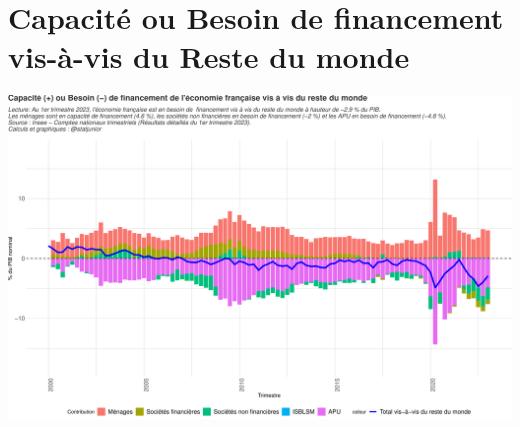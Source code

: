\documentclass[
  paper=a4,
  ,captions=tableheading
]{scrartcl}
\begin{document}
\newpage

\hypertarget{capacituxe9-ou-besoin-de-financement-vis-uxe0-vis-du-reste-du-monde}{%
\section{Capacité ou Besoin de financement vis-à-vis du Reste du
monde}\label{capacituxe9-ou-besoin-de-financement-vis-uxe0-vis-du-reste-du-monde}}

\includegraphics{rapport_pdf_csi_files/figure-latex/unnamed-chunk-18-1.pdf}
\end{document}
